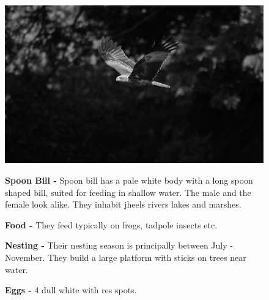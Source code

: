 \begin{figure}[H]
\begin{center}
\includegraphics{figure/Land_birds/01_pariah_kite/pariah-kite.eps}
\end{center}
\medskip
\noindent
{\bf Spoon Bill -} Spoon bill has a pale white body with a long spoon shaped bill, suited for feeding in shallow water. The male and the female look alike. They inhabit jheels rivers lakes and marshes. 

\medskip
{\bf Food -} They feed typically on frogs, tadpole insects etc.

{\bf Nesting -} Their nesting season is principally between July - November. They build a large platform with sticks on trees near water. 

{\bf Eggs -} 4 dull white with res spots.
\end{figure}

\vfill\eject

~\phantom{a}
\vfill


